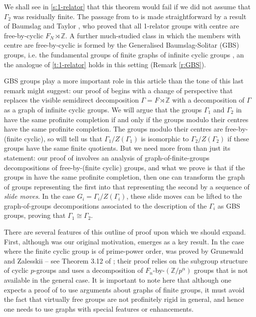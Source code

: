 \documentclass[11pt, a4 paper]{amsart}
\numberwithin{equation}{section}
\theoremstyle{remark}
\theoremstyle{definition}
\def\Z{\mathbb Z}
\def\G{\Gamma}
\def\G{\Gamma}
\begin{document}
We shall see in \cref{s:1-relator} 
that this theorem would fail 
if we did not assume that $\G_2$ was residually finite. 
The passage from  to  
is made straightforward 
by a result of Baumslag and Taylor \cite{baumslag1967centre}, 
who proved that all 1-relator groups with centre 
are free-by-cyclic $F_N\rtimes\Z$. 
A further much-studied class 
in which the members with centre are free-by-cyclic 
is formed by the Generalised Baumslag-Solitar (GBS) groups, 
i.e. the fundamental groups of 
finite graphs of infinite cyclic groups \cite{levitt2015generalized}, an the analogue of  \cref{t:1-relator} holds in this
setting (Remark \ref{r:GBS}). 

GBS groups play a more important role in this article 
than the tone of this last remark might suggest: 
our proof of  begins with a change of perspective 
that replaces the visible semidirect decomposition 
$\G=F\rtimes\Z$ 
with a decomposition of $\G$ 
as a graph of infinite cyclic groups. 
We will argue that the groups $\G_1$ and $\G_2$ in  
have the same profinite completion if and only if 
the groups modulo their centres
have the same profinite completion. 
The groups modulo their centres are free-by-(finite cyclic), 
so  will tell us that 
$\G_1/Z(\G_1)$ is isomorphic to $\G_2/Z(\G_2)$ 
if these groups have the same finite quotients. 
But we need more from  
than just its statement: 
our proof of  involves 
an analysis of graph-of-finite-groups decompositions 
of free-by-(finite cyclic) groups, 
and what we prove is that 
if the groups in  
have the same profinite completion, 
then one can transform the graph of groups 
representing the first into that representing the second 
by a sequence of {\em slide moves}. 
In the case $G_i=\G_i/Z(\G_i)$, 
these slide moves can be lifted 
to the graph-of-groups decompositions 
associated to the description of the $\G_i$ as GBS groups, 
proving that $\G_1\cong\G_2$.

There are several features of this outline of proof 
upon which we should expand. 
First, although  was our original motivation, 
 emerges as a key result. 
In the case where 
the finite cyclic group is of prime-power order, 
was proved by Grunewald and Zalesskii -- 
see Theorem 3.12 of \cite{grunewald2011genus};
their proof relies on 
the subgroup structure of cyclic $p$-groups 
and uses a decomposition of $F_n$-by-$(\Z/p^\alpha)$ groups 
that is not available in the general case. 
It is important to note here that although one expects 
a proof of  
to use arguments about graphs of finite groups, 
it must avoid the fact that 
virtually free groups are not profinitely rigid in general, 
and hence one needs to use 
graphs with special features or enhancements. 
\end{document}
